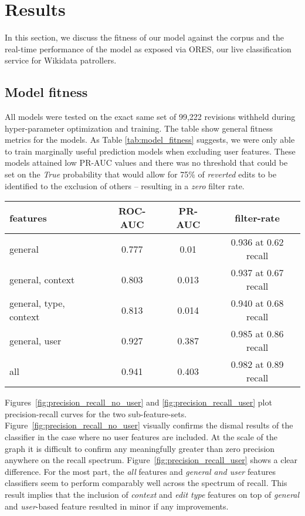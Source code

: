 \documentclass{sig-alternate}
\begin{document}
\section{Results}
In this section, we discuss the fitness of our model against the corpus and the real-time performance of the model as exposed via ORES, our live classification service for Wikidata patrollers.
\subsection{Model fitness}
All models were tested on the exact same set of 99,222 revisions withheld during hyper-parameter optimization and training.  The table show general fitness metrics for the models.  As Table \ref{tab:model_fitness} suggests, we were only able to train marginally useful prediction models when excluding user features.  These models attained low PR-AUC values and there was no threshold that could be set on the \textit{True} probability that would allow for 75\% of \textit{reverted} edits to be identified to the exclusion of others -- resulting in a \textit{zero} filter rate.

\begin{table*}
\label{tab:model_fitness}
\centering
\caption{Model fitness for different subsets of features}
\begin{tabular}{l|c|c|c} \hline
features & ROC-AUC & PR-AUC & filter-rate \\ \hline
general & 0.777 & 0.01 & 0.936 at 0.62 recall \\  \hline
general, context & 0.803 & 0.013 & 0.937 at 0.67 recall \\  \hline
general, type, context & 0.813 & 0.014 & 0.940 at 0.68 recall \\  \hline
general, user & 0.927 & 0.387 & 0.985 at 0.86 recall \\  \hline
all & 0.941 & 0.403 & 0.982 at 0.89 recall \\  \hline
\end{tabular}
\end{table*}

Figures~\ref{fig:precision_recall_no_user} and \ref{fig:precision_recall_user} plot precision-recall curves for the two sub-feature-sets. Figure~\ref{fig:precision_recall_no_user} visually confirms the dismal results of the classifier in the case where no user features are included.  At the scale of the graph it is difficult to confirm any meaningfully greater than zero precision anywhere on the recall spectrum. Figure~\ref{fig:precision_recall_user} shows a clear difference.  For the most part, the \textit{all} features and \textit{general and user} features classifiers seem to perform comparably well across the spectrum of recall.  This result implies that the inclusion of \textit{context} and \textit{edit type} features on top of \textit{general} and \textit{user}-based feature resulted in minor if any improvements.
\end{document}
